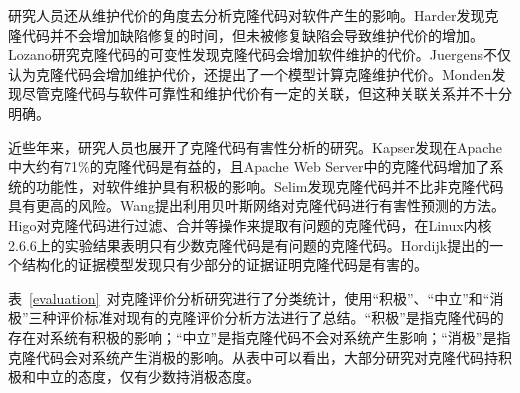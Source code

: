 研究人员还从维护代价的角度去分析克隆代码对软件产生的影响\cite{bakota2007clone}。Harder发现克隆代码并不会增加缺陷修复的时间，但未被修复缺陷会导致维护代价的增加\cite{harder2012controlled}。Lozano研究克隆代码的可变性发现克隆代码会增加软件维护的代价\cite{lozano2008assessing}。Juergens不仅认为克隆代码会增加维护代价，还提出了一个模型计算克隆维护代价\cite{juergens2010much}。Monden发现尽管克隆代码与软件可靠性和维护代价有一定的关联，但这种关联关系并不十分明确\cite{monden2002software}。

近些年来，研究人员也展开了克隆代码有害性分析的研究。Kapser发现在Apache中大约有71\%的克隆代码是有益的，且Apache Web Server中的克隆代码增加了系统的功能性，对软件维护具有积极的影响\cite{kapser2006cloning,kapser2008cloning,kapser2006supporting}。Selim发现克隆代码并不比非克隆代码具有更高的风险\cite{selim2010studying}。Wang提出利用贝叶斯网络对克隆代码进行有害性预测的方法\cite{wang2012can}。Higo对克隆代码进行过滤、合并等操作来提取有问题的克隆代码，在Linux内核2.6.6上的实验结果表明只有少数克隆代码是有问题的克隆代码\cite{higo2009problematic}。Hordijk提出的一个结构化的证据模型发现只有少部分的证据证明克隆代码是有害的\cite{hordijk2009harmfulness}。

表~\ref{evaluation}~对克隆评价分析研究进行了分类统计，使用“积极”、“中立”和“消极”三种评价标准对现有的克隆评价分析方法进行了总结。“积极”是指克隆代码的存在对系统有积极的影响；“中立”是指克隆代码不会对系统产生影响；“消极”是指克隆代码会对系统产生消极的影响。从表中可以看出，大部分研究对克隆代码持积极和中立的态度，仅有少数持消极态度。

